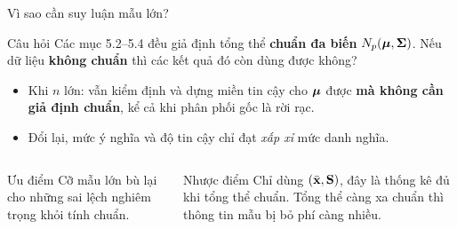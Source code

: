 \begin{frame}{Vì sao cần suy luận mẫu lớn?}
  \begin{block}{Câu hỏi}
    Các mục 5.2--5.4 đều giả định tổng thể \textbf{chuẩn đa biến} \(N_p(\boldsymbol{\mu},\boldsymbol{\Sigma})\).
    Nếu dữ liệu \textbf{không chuẩn} thì các kết quả đó còn dùng được không?
  \end{block}
  \begin{itemize}
    \item Khi \(n\) lớn: vẫn kiểm định và dựng miền tin cậy cho \(\boldsymbol{\mu}\) được
          \textbf{mà không cần giả định chuẩn}, kể cả khi phân phối gốc là rời rạc.
    \item Đổi lại, mức ý nghĩa và độ tin cậy chỉ đạt \emph{xấp xỉ} mức danh nghĩa.
  \end{itemize}
  \vspace{0.15cm}
  \begin{columns}[T]
    \begin{exampleblock}{Ưu điểm}
      Cỡ mẫu lớn bù lại cho những sai lệch nghiêm trọng khỏi tính chuẩn.
    \end{exampleblock}
    \begin{alertblock}{Nhược điểm}
      Chỉ dùng \((\bar{\mathbf{x}},\mathbf{S})\), đây là thống kê đủ khi tổng thể chuẩn.
      Tổng thể càng xa chuẩn thì thông tin mẫu bị bỏ phí càng nhiều.
    \end{alertblock}
  \end{columns}
\end{frame}

